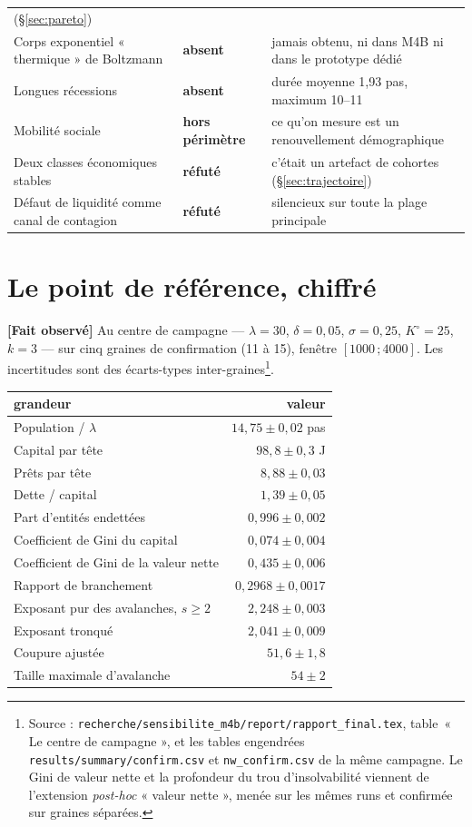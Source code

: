 \documentclass[11pt,a4paper]{article}
\newcommand{\code}[1]{\texttt{#1}}
\newcommand{\fait}{\textbf{[Fait observé]}}
\begin{document}
\begin{longtable}{@{}p{}p{}p{}@{}}
  (§\ref{sec:pareto}) \\
Corps exponentiel « thermique » de Boltzmann & \textbf{absent} &
  jamais obtenu, ni dans M4B ni dans le prototype dédié \\
Longues récessions & \textbf{absent} &
  durée moyenne 1,93 pas, maximum 10--11 \\
Mobilité sociale & \textbf{hors périmètre} &
  ce qu'on mesure est un renouvellement démographique \\
Deux classes économiques stables & \textbf{réfuté} &
  c'était un artefact de cohortes (§\ref{sec:trajectoire}) \\
Défaut de liquidité comme canal de contagion & \textbf{réfuté} &
  silencieux sur toute la plage principale \\
\bottomrule
\end{longtable}

\section{Le point de référence, chiffré}

\fait{} Au centre de campagne --- $\lambda = 30$, $\delta = 0{,}05$,
$\sigma = 0{,}25$, $K^\circ = 25$, $k = 3$ --- sur cinq graines de confirmation
(11 à 15), fenêtre $[1000\,;4000]$. Les incertitudes sont des écarts-types
inter-graines\footnote{Source :
\code{recherche/sensibilite\_m4b/report/rapport\_final.tex},
table~« Le centre de campagne », et les tables engendrées
\code{results/summary/confirm.csv} et \code{nw\_confirm.csv} de la même
campagne. Le Gini de valeur nette et la profondeur du trou d'insolvabilité
viennent de l'extension \emph{post-hoc} « valeur nette », menée sur les mêmes
runs et confirmée sur graines séparées.}.

\begin{longtable}{@{}lr@{}}
\toprule
\textbf{grandeur} & \textbf{valeur} \\
\midrule
\endhead
Population / $\lambda$ & $14{,}75 \pm 0{,}02$ pas \\
Capital par tête & $98{,}8 \pm 0{,}3$ J \\
Prêts par tête & $8{,}88 \pm 0{,}03$ \\
Dette / capital & $1{,}39 \pm 0{,}05$ \\
Part d'entités endettées & $0{,}996 \pm 0{,}002$ \\
Coefficient de Gini du capital & $0{,}074 \pm 0{,}004$ \\
Coefficient de Gini de la valeur nette & $0{,}435 \pm 0{,}006$ \\
Rapport de branchement & $0{,}2968 \pm 0{,}0017$ \\
Exposant pur des avalanches, $s \ge 2$ & $2{,}248 \pm 0{,}003$ \\
Exposant tronqué & $2{,}041 \pm 0{,}009$ \\
Coupure ajustée & $51{,}6 \pm 1{,}8$ \\
Taille maximale d'avalanche & $54 \pm 2$ \\
\bottomrule
\end{longtable}
\end{document}
